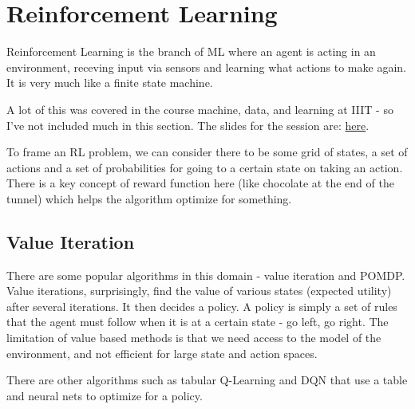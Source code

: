 \chapter{Reinforcement Learning}

Reinforcement Learning is the branch of ML where an agent is acting in an environment, receving input via sensors and learning what actions to make again. It is very much like a finite state machine. 

A lot of this was covered in the course machine, data, and learning at IIIT - so I've not included much in this section. The slides for the session are: \href{https://raw.githubusercontent.com/RoboticsIIITH/summer-sessions-2020/master/lecture-slides/Reinforcement_Learning/Reinforcement\%20Learning\%20slides.pdf}{here}.

To frame an RL problem, we can consider there to be some grid of states, a set of actions and a set of probabilities for going to a certain state on taking an action. There is a key concept of reward function here (like chocolate at the end of the tunnel) which helps the algorithm optimize for something. 

\section{Value Iteration}

There are some popular algorithms in this domain - value iteration and POMDP. Value iterations, surprisingly, find the value of various states (expected utility) after several iterations. It then decides a policy. A policy is simply a set of rules that the agent must follow when it is at a certain state - go left, go right. The limitation of value based methods is that we need access to the model of the environment, and not efficient for large state and action spaces.

There are other algorithms such as tabular Q-Learning and DQN that use a table and neural nets to optimize for a policy. 

